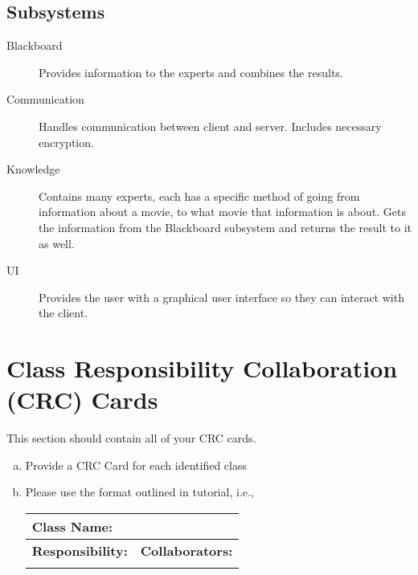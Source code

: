 \documentclass[]{article}
\begin{document}
\subsection{Subsystems}
\label{sub:subsystems}
\begin{description}
	\item[Blackboard] Provides information to the experts and combines the results.
	\item[Communication] Handles communication between client and server. Includes necessary encryption.
	\item[Knowledge] Contains many experts, each has a specific method of going from information about a movie, to what movie that information is about. Gets the information from the Blackboard subsystem and returns the result to it as well.
	\item[UI] Provides the user with a graphical user interface so they can interact with the client.
\end{description}

	
\section{Class Responsibility Collaboration (CRC) Cards}
\label{sec:class_responsibility_collaboration_crc_cards}
This section should contain all of your CRC cards.

\begin{enumerate}[a)]
	\item Provide a CRC Card for each identified class
	\item Please use the format outlined in tutorial, i.e., 
	\begin{table}[ht]
		\centering
		\begin{tabular}{|p{5cm}|p{5cm}|}
		\hline 
		 \multicolumn{2}{|l|}{\textbf{Class Name:}} \\
		\hline
		\textbf{Responsibility:} & \textbf{Collaborators:} \\
		\hline
		\vspace{1in} & \\
		\hline
		\end{tabular}
	\end{table}
	
\end{enumerate}

\newpage
\appendix
\end{document}
